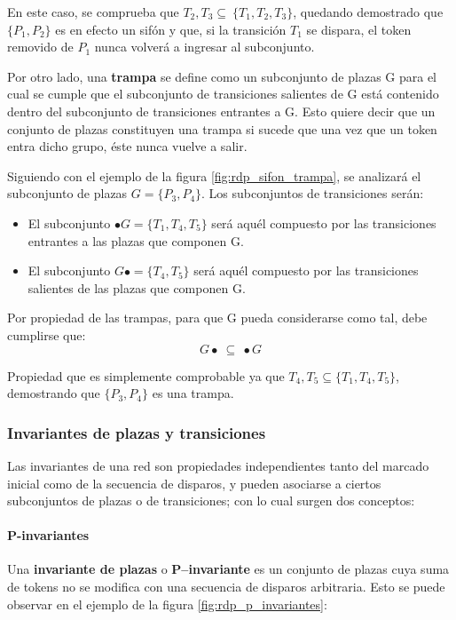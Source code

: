 En este caso, se comprueba que ${T_2 , T_3} \subseteq \ \{T_1 , T_2 , T_3 \}$, quedando demostrado que $\{P_1,P_2\}$ es en efecto un sifón y que, si la transición $T_1$ se dispara, el token removido de $P_1$ nunca volverá a ingresar al subconjunto. \\ \par

Por otro lado, una \textbf{trampa} se define como un subconjunto de plazas G para el cual se cumple que el subconjunto de transiciones salientes de G está contenido dentro del subconjunto de transiciones entrantes a G. Esto quiere decir que un conjunto de plazas constituyen una trampa si sucede que una vez que un token entra dicho grupo, éste nunca vuelve a salir.

Siguiendo con el ejemplo de la figura \ref{fig:rdp_sifon_trampa}, se analizará el subconjunto de plazas $G = \{P_3 , P_4\}$.  Los subconjuntos de transiciones serán:
\begin{itemize}
    \item El subconjunto $\bullet G = \{T_1 , T_4 , T_5 \}$ será aquél compuesto por las transiciones entrantes a las plazas que componen G.
    \item El subconjunto $G \bullet = \{T_4, T_5 \}$ será aquél compuesto por las transiciones salientes de las plazas que componen G.
\end{itemize}

\noindent Por propiedad de las trampas, para que G pueda considerarse como tal, debe cumplirse que:
\begin{equation}
    G \bullet \ \subseteq \ \bullet G
\end{equation}

Propiedad que es simplemente comprobable ya que ${T_4 , T_5} \subseteq \{T_1 , T_4 , T_5 \}$, demostrando que $\{P_3 , P_4\}$ es una trampa.

\subsubsection{Invariantes de plazas y transiciones}
Las invariantes de una red son propiedades independientes tanto del marcado inicial como de la secuencia de disparos, y pueden asociarse a ciertos subconjuntos de plazas o de transiciones; con lo cual surgen dos conceptos:

\paragraph{P-invariantes}
Una \textbf{invariante de plazas} o \textbf{P–invariante} es un conjunto de plazas cuya suma de tokens no se modifica con una secuencia de disparos arbitraria. 
Esto se puede observar en el ejemplo de la figura \ref{fig:rdp_p_invariantes}:

